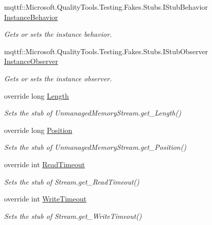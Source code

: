 \begin{DoxyCompactItemize}
mqttf\-::\-Microsoft.\-Quality\-Tools.\-Testing.\-Fakes.\-Stubs.\-I\-Stub\-Behavior \hyperlink{class_system_1_1_i_o_1_1_fakes_1_1_stub_unmanaged_memory_stream_a6e73d1984cc632359900126438f5c2a4}{Instance\-Behavior}
\begin{DoxyCompactList}\small\item\em Gets or sets the instance behavior.\end{DoxyCompactList}\item 
mqttf\-::\-Microsoft.\-Quality\-Tools.\-Testing.\-Fakes.\-Stubs.\-I\-Stub\-Observer \hyperlink{class_system_1_1_i_o_1_1_fakes_1_1_stub_unmanaged_memory_stream_ab6362b31b120e07056c6a98a2c8ca717}{Instance\-Observer}
\begin{DoxyCompactList}\small\item\em Gets or sets the instance observer.\end{DoxyCompactList}\item 
override long \hyperlink{class_system_1_1_i_o_1_1_fakes_1_1_stub_unmanaged_memory_stream_a736d401a9e9515c8fe8781e5b87e43bb}{Length}
\begin{DoxyCompactList}\small\item\em Sets the stub of Unmanaged\-Memory\-Stream.\-get\-\_\-\-Length()\end{DoxyCompactList}\item 
override long \hyperlink{class_system_1_1_i_o_1_1_fakes_1_1_stub_unmanaged_memory_stream_ab7f63a0c3b885888bd89a2a8d8b86788}{Position}
\begin{DoxyCompactList}\small\item\em Sets the stub of Unmanaged\-Memory\-Stream.\-get\-\_\-\-Position()\end{DoxyCompactList}\item 
override int \hyperlink{class_system_1_1_i_o_1_1_fakes_1_1_stub_unmanaged_memory_stream_adea7e365f22e2357d86680344e49e649}{Read\-Timeout}
\begin{DoxyCompactList}\small\item\em Sets the stub of Stream.\-get\-\_\-\-Read\-Timeout()\end{DoxyCompactList}\item 
override int \hyperlink{class_system_1_1_i_o_1_1_fakes_1_1_stub_unmanaged_memory_stream_aa26b397c0e12263c9812f3dd9d9fa959}{Write\-Timeout}
\begin{DoxyCompactList}\small\item\em Sets the stub of Stream.\-get\-\_\-\-Write\-Timeout()\end{DoxyCompactList}\end{DoxyCompactItemize}


